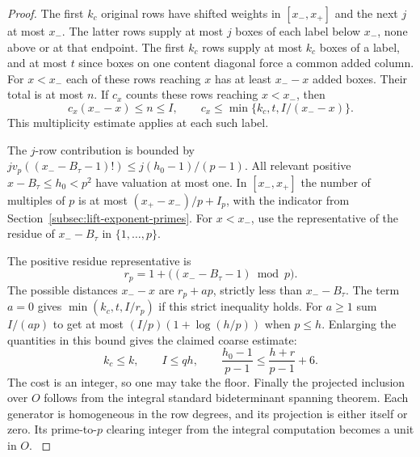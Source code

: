 \begin{proof}
The first \(k_c\) original rows have
shifted weights in \([x_-,x_+]\) and the next \(j\)
at most \(x_-\). The latter rows supply at most \(j\)
boxes of each label below \(x_-\), none above or at that
endpoint. The first \(k_c\) rows supply at most \(k_c\) boxes of a
label, and at most \(t\) since boxes on one content
diagonal force a common added column. For \(x<x_-\) each
of these rows reaching \(x\) has at least \(x_--x\) added
boxes. Their total is at most \(n\). If \(c_x\) counts these rows reaching \(x<x_-\), then
\[
       c_x(x_--x)\le n\le I,\qquad
       c_x\le \min\{k_c,t,I/(x_--x)\}.
\]
This multiplicity estimate applies at each such label.

The \(j\)-row contribution is bounded by
\(jv_p((x_--B_\tau-1)!)\le j(h_0-1)/(p-1)\).
All relevant positive \(x-B_\tau\le h_0<p^2\) have
valuation at most one. In \([x_-,x_+]\) the number
of multiples of \(p\) is at most \((x_+-x_-)/p+I_p\),
with the indicator from Section~\ref{subsec:lift-exponent-primes}.
For \(x<x_-\), use the representative of the residue of \(x_--B_\tau\) in \(\{1,\ldots,p\}\).

The positive residue representative is
\[
 r_p=1+\bigl((x_--B_\tau-1)\bmod p\bigr).
\] The
possible distances \(x_--x\) are \(r_p+ap\), strictly
less than \(x_--B_\tau\). The term \(a=0\) gives
\(\min(k_c,t,I/r_p)\) if this strict inequality holds.
For \(a\ge1\) sum \(I/(ap)\) to get at most
\((I/p)(1+\log(h/p))\) when \(p\le h\).
Enlarging the quantities in this bound gives the claimed coarse estimate:
\[
 k_c\le k,\qquad I\le qh,\qquad \frac{h_0-1}{p-1}\le\frac{h+r}{p-1}+6 .
\] The cost is an
integer, so one may take the floor. Finally the projected
inclusion over \(O\) follows from the integral standard
bideterminant spanning theorem. Each generator is homogeneous
in the row degrees, and its projection is either itself or
zero. Its prime-to-\(p\) clearing integer from the integral
computation becomes a unit in \(O\).
\label{cor:lift-pieri-cost-6}
\end{proof}
